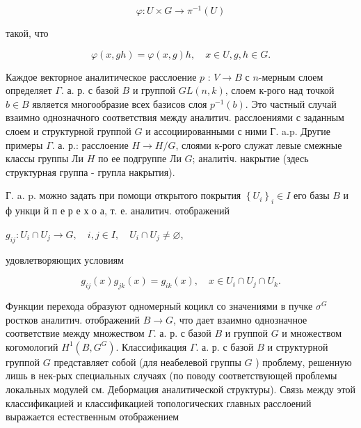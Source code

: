 \documentclass[10pt]{article}
\begin{document}
\[

\varphi: U \times G \rightarrow \pi^{-1}(U)

\]



такой, что



\[

\varphi(x, g h)=\varphi(x, g) h, \quad x \in U, g, h \in G .

\]



Каждое векторное аналитическое расслоение $p$ : $V \rightarrow B$ с $n$-мерным слоем определяет $\Gamma$. а. р. с базой $B$ и группой $G L(n, k)$, слоем к-рого над точкой $b \in B$ является многообразие всех базисов слоя $p^{-1}(b)$. Это частный случай взаимно однозначного соответствия между аналитич. расслоениями с заданным слоем и структурной группой $G$ и ассоциированными с ними Г. a.p. Другие примеры $\Gamma$. а. р.: расслоение $H \rightarrow H / G$, слоями к-рого служат левые смежные классы группы Ли $H$ по ее подгруппе Ли $G$; аналитіч. накрытие (здесь структурная группа - групла накрытия).



Г. a. p. можно задать при помощи открытого покрытия $\left\{U_{i}\right\}_{i} \in I$ его базы $B$ и ф ункци й п е р е х о а, т. е. аналитич. отображений



$g_{i j}: U_{i} \cap U_{j} \rightarrow G, \quad i, j \in I, \quad U_{i} \cap U_{j} \neq \varnothing$,



удовлетворяющих условиям



\[

g_{i j}(x) g_{j k}(x)=g_{i k}(x), \quad x \in U_{i} \cap U_{j} \cap U_{k} .

\]



Функции перехода образуют одномерный коцикл со значениями в пучке $\sigma^{G}$ ростков аналитич. отображений $B \rightarrow G$, что дает взаимно однозначное соответствие между множеством $\Gamma$. а. р. с базой $B$ и группой $G$ и множеством когомологий $H^{1}\left(B, G^{G}\right)$. Классификация $\Gamma$. а. р. с базой $B$ и структурной группой $G$ представляет собой (для неабелевой группы $G$ ) проблему, решенную лишь в нек-рых специальных случаях (по поводу соответствующей проблемы локальных модулей см. Дебормация аналитической структуры). Связь между этой классификацией и классификацией топологических главных расслоений выражается естественным отображением
\end{document}
